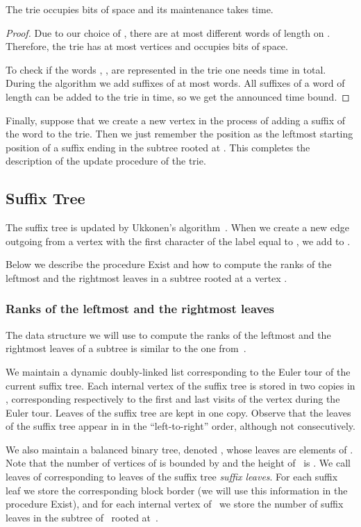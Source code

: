 \documentclass[10pt]{llncs}
\newcommand{\exist}{{\sc Exist}}
\begin{document}
\begin{lemma}
\label{lm:CT}
The trie occupies  bits of space and its maintenance takes  time.
\end{lemma}
\begin{proof}
Due to our choice of , there are at most  different words of length  on . Therefore, the trie has at most  vertices and occupies  bits of space.

To check if the words , , are represented in the trie one needs  time in total. During the algorithm we add suffixes of at most  words. All suffixes of a word of length  can be added to the trie in  time, so we get the announced time bound.
\end{proof}

Finally, suppose that we create a new vertex  in the process of adding a suffix  of the word  to the trie. Then we just remember the position  as the leftmost starting position of a suffix ending in the subtree rooted at . This completes the description of the update procedure of the trie.

\subsection{Suffix Tree}
The suffix tree is updated by Ukkonen's algorithm~\cite{ukkonen:on-line}. When we create a new edge outgoing from a vertex  with the first character of the label equal to , we add  to .

Below we describe the procedure \exist{} and how to compute the ranks of the leftmost and the rightmost leaves in a subtree rooted at a vertex .

\subsubsection{Ranks of the leftmost and the rightmost leaves}
The data structure we will use to compute the ranks of the leftmost and the rightmost leaves of a subtree is similar to the one from~\cite{KNS12}.

We maintain a dynamic doubly-linked list  corresponding to the Euler tour of the current suffix tree. Each internal vertex of the suffix tree is stored in two copies in , corresponding respectively to the first and last visits of the vertex during the Euler tour. Leaves of the suffix tree are kept in one copy. Observe that the leaves of the suffix tree appear in  in the ``left-to-right'' order, although not consecutively.

We also maintain a balanced binary tree, denoted , whose leaves are elements of . Note that the number of vertices of  is bounded by  and the height of~ is . We call leaves of  corresponding to leaves of the suffix tree {\em suffix leaves}. For each suffix leaf we store the corresponding block border (we will use this information in the procedure \exist{}), and for each internal vertex  of~ we store the number of suffix leaves in the subtree of~ rooted at~.
\end{document}

